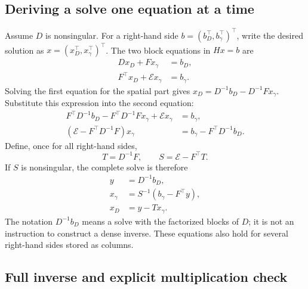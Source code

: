 \subsection{Deriving a solve one equation at a time}
\label{cov-schur-solve}

Assume $D$ is nonsingular.  For a right-hand side
$b=(b_D^\top,b_\gamma^\top)^\top$, write the desired solution as
$x=(x_D^\top,x_\gamma^\top)^\top$.  The two block equations in $Hx=b$ are
\begin{align}
 Dx_D+Fx_\gamma&=b_D, \label{cov-first-block-equation}\\
 F^\top x_D+\mathcal E x_\gamma&=b_\gamma .
\end{align}
Solving the first equation for the spatial part gives
$x_D=D^{-1}b_D-D^{-1}Fx_\gamma$.  Substitute this expression into
the second equation:
\begin{align}
 F^\top D^{-1}b_D-F^\top D^{-1}Fx_\gamma
                      +\mathcal E x_\gamma&=b_\gamma,\\
 (\mathcal E-F^\top D^{-1}F)x_\gamma
                      &=b_\gamma-F^\top D^{-1}b_D .
\end{align}
Define, once for all right-hand sides,
\begin{equation}
 T=D^{-1}F,\qquad S=\mathcal E-F^\top T .
 \label{cov-schur-definitions}
\end{equation}
If $S$ is nonsingular, the complete solve is therefore
\begin{align}
 y&=D^{-1}b_D,\\
 x_\gamma&=S^{-1}(b_\gamma-F^\top y),\\
 x_D&=y-Tx_\gamma .
 \label{cov-schur-algorithm}
\end{align}
The notation $D^{-1}b_D$ means a solve with the factorized blocks of $D$;
it is not an instruction to construct a dense inverse.  These equations
also hold for several right-hand sides stored as columns.

\subsection{Full inverse and explicit multiplication check}
\label{cov-full-inverse}

